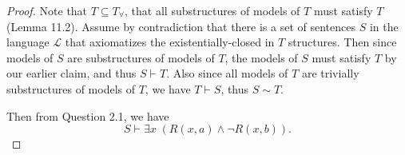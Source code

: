 \documentclass{article}
\begin{document}
\begin{enumerate}[label={\bf Q\arabic*:}]
\begin{enumerate}
\begin{proof}
          Note that $T\subseteq T_\forall$,
          that all substructures of models of $T$ must satisfy $T$ (Lemma
          11.2). Assume by contradiction that there is a set of sentences
          $S$ in the language $\mathcal{L}$ that axiomatizes the
          existentially-closed in $T$ structures. Then since models of $S$
          are substructures of models of $T$, the models of $S$ must
          satisfy $T$ by our earlier claim, and thus $S\vdash T$. Also
          since all models of $T$ are trivially substructures of models of
          $T$, we have $T\vdash S$, thus $S\sim T$.

          Then from Question 2.1, we
          have
          \[S\vdash \exists x\; (R(x,a)\wedge\neg R(x,b)).\]
        \end{proof}
    \end{enumerate}
\end{enumerate}
\end{document}
